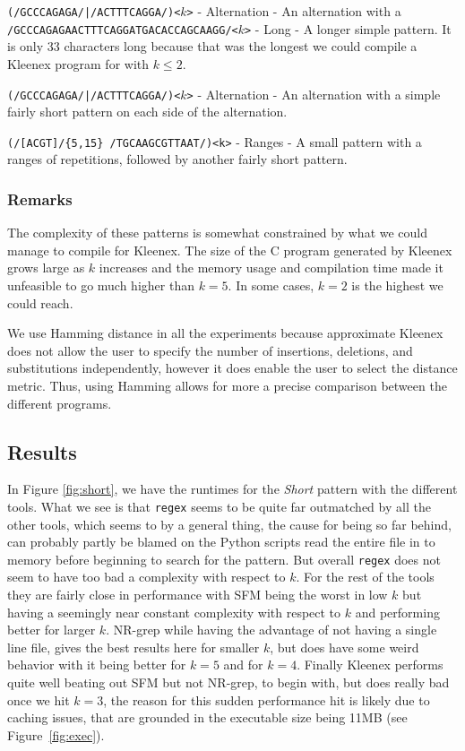 \texttt{(/GCCCAGAGA/|/ACTTTCAGGA/)<$k$>} - Alternation - An alternation with a
\texttt{/GCCCAGAGAACTTTCAGGATGACACCAGCAAGG/<$k$>} - Long - A longer simple
pattern. It is only 33 characters long because that was the longest we could
compile a Kleenex program for with $k \leq 2$.

\texttt{(/GCCCAGAGA/|/ACTTTCAGGA/)<$k$>} - Alternation - An alternation with a
simple fairly short pattern on each side of the alternation.

\texttt{(/[ACGT]/\{5,15\} /TGCAAGCGTTAAT/)<k>} - Ranges - A small pattern with
a ranges of repetitions, followed by another fairly short pattern.


\subsubsection{Remarks}
The complexity of these patterns is somewhat constrained by what we could
manage to compile for Kleenex. The size of the C program generated by Kleenex
grows large as $k$ increases and the memory usage and compilation time made it
unfeasible to go much higher than $k=5$. In some cases, $k=2$ is the highest we
could reach.

We use Hamming distance in all the experiments because approximate Kleenex does
not allow the user to specify the number of insertions, deletions, and
substitutions independently, however it does enable the user to select the
distance metric. Thus, using Hamming allows for more a precise comparison
between the different programs.


\subsection{Results}
In Figure \ref{fig:short}, we have the runtimes for the \textit{Short} pattern
with the different tools. What we see is that \texttt{regex} seems to be quite
far outmatched by all the other tools, which seems to by a general thing, the
cause for being so far behind, can probably partly be blamed on the Python
scripts read the entire file in to memory before beginning to search for the
pattern. But overall \texttt{regex} does not seem to have too bad a complexity
with respect to $k$. For the rest of the tools they are fairly close in
performance with SFM being the worst in low $k$ but having a seemingly near
constant complexity with respect to $k$ and performing better for larger $k$.
NR-grep while having the advantage of not having a single line file, gives the
best results here for smaller $k$, but does have some weird behavior with it
being better for $k=5$ and for $k=4$. Finally Kleenex performs quite well
beating out SFM but not NR-grep, to begin with, but does really bad once we hit
$k=3$, the reason for this sudden performance hit is likely due to caching
issues, that are grounded in the executable size being 11MB (see
Figure~\ref{fig:exec}).

